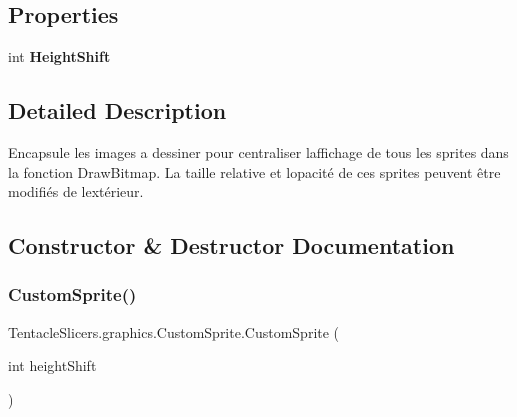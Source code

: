 \subsection*{Properties}
\begin{DoxyCompactItemize}
\item 
\mbox{\label{class_tentacle_slicers_1_1graphics_1_1_custom_sprite_a03bd6e9fdc71437b3fb3d9690ffc9bd2}} 
int {\bfseries Height\+Shift}
\end{DoxyCompactItemize}


\subsection{Detailed Description}
Encapsule les images a dessiner pour centraliser l\textquotesingle{}affichage de tous les sprites dans la fonction Draw\+Bitmap. La taille relative et l\textquotesingle{}opacité de ces sprites peuvent être modifiés de l\textquotesingle{}extérieur. 



\subsection{Constructor \& Destructor Documentation}
\mbox{\label{class_tentacle_slicers_1_1graphics_1_1_custom_sprite_aa82214d79a4a4a6b1ca3cd08f23e3f0d}} 
\subsubsection{\texorpdfstring{Custom\+Sprite()}{CustomSprite()}}
{\footnotesize\ttfamily Tentacle\+Slicers.\+graphics.\+Custom\+Sprite.\+Custom\+Sprite (\begin{DoxyParamCaption}\item[{int}]{height\+Shift }\end{DoxyParamCaption})\hspace{0.3cm}{\ttfamily [protected]}}



